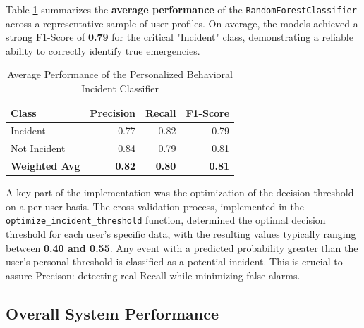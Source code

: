 \documentclass[12pt,a4paper,oneside,english]{book}
\begin{document}
{Table \ref{tab:behavioral_results} summarizes the \textbf{average performance} of the \texttt{RandomForestClassifier} across a representative sample of user profiles. On average, the models achieved a strong F1-Score of \textbf{0.79} for the critical "Incident" class, demonstrating a reliable ability to correctly identify true emergencies.

\begin{table}[h!]
    \centering
    \caption{Average Performance of the Personalized Behavioral Incident Classifier}
    \label{tab:behavioral_results}
    \begin{tabular}{lrrr}
        \hline
        \textbf{Class} & \textbf{Precision} & \textbf{Recall} & \textbf{F1-Score} \\ \hline
        Incident       & 0.77               & 0.82            & 0.79              \\
        Not Incident   & 0.84               & 0.79            & 0.81              \\ \hline
        \textbf{Weighted Avg} & \textbf{0.82} & \textbf{0.80} & \textbf{0.81} \\ \hline
    \end{tabular}
\end{table}

A key part of the implementation was the optimization of the decision threshold on a per-user basis. The cross-validation process, 
implemented in the \texttt{optimize\_incident\_threshold} function, determined the optimal decision threshold for each user's specific data, 
with the resulting values typically ranging between \textbf{0.40 and 0.55}. Any event with a predicted probability greater than the user's 
personal threshold is classified as a potential incident. This is crucial to assure Precison: detecting real Recall while minimizing false alarms.


    \subsection{Overall System Performance}
    \label{subsec:overall_results}

}
\end{document}
